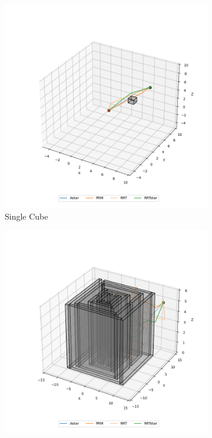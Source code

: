 \documentclass[conference]{IEEEtran}
\begin{document}
\begin{figure}[htbp]
    \centering

    \begin{subfigure}[b]{0.3\textwidth}
        \centering
        \includegraphics[width=\textwidth]{img/single_cube.png}
        \caption{Single Cube}
    \end{subfigure}
    \hfill
    \begin{subfigure}[b]{0.3\textwidth}
        \centering
        \includegraphics[width=\textwidth]{img/maze.png}

\end{subfigure}
\end{figure}
\end{document}
